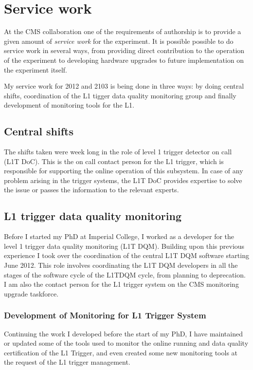 \documentclass[%
reprint,
amsmath,
amssymb,
aps,
pra,
showkeys
]{revtex4-1}
\begin{document}
\section{Service work}

At the CMS collaboration one of the requirements of authorship is to provide a given amount of \textit{service work}
for the experiment.
It is possible possible to do service work in several ways, from providing direct contribution to the operation of
the experiment to developing hardware upgrades to future implementation on the experiment itself.

My service work for 2012 and 2103 is being done in three ways: by doing central shifts, coordination of the L1 tigger
data quality monitoring group and finally development of monitoring tools for the L1.

\subsection{Central shifts}

The shifts taken were week long in the role of level 1 trigger detector on call (L1T DoC). This is the on call contact
person for the L1 trigger, which is responsible for supporting the online operation of this subsystem. In case of
any problem arising in the trigger systems, the L1T DoC provides expertise to solve the issue or passes the information
to the relevant experts.

\subsection{L1 trigger data quality monitoring}

Before I started my PhD at Imperial College, I worked as a developer for the level 1 trigger data quality monitoring
(L1T DQM). Building upon this previous experience I took over the coordination of the central L1T DQM software starting
June 2012. This role involves coordinating the L1T DQM developers in all the stages of the software cycle of the L1TDQM
cycle, from planning to deprecation. I am also the contact person for the L1 trigger system on the CMS monitoring 
upgrade taskforce.

\subsubsection{Development of Monitoring for L1 Trigger System}

Continuing the work I developed before the start of my PhD, I have maintained or updated some of the tools
used to monitor the online running and data quality certification of the L1 Trigger, and even created some new 
monitoring tools at the request of the L1 trigger management. 
\end{document}
